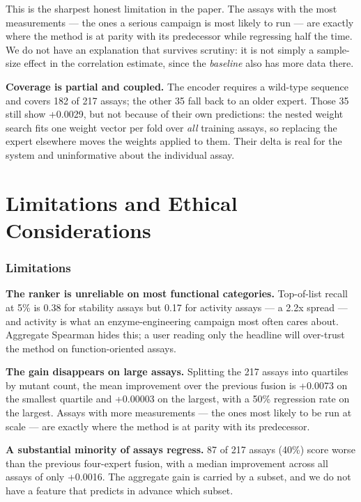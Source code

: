 \documentclass[sigconf,review,nonacm]{acmart}
\begin{document}
This is the sharpest honest limitation in the paper. The assays with the most measurements --- the ones a
serious campaign is most likely to run --- are exactly where the method is at parity with its predecessor
while regressing half the time. We do not have an explanation that survives scrutiny: it is not simply a
sample-size effect in the correlation estimate, since the \emph{baseline} also has more data there.

\textbf{Coverage is partial and coupled.} The encoder requires a wild-type sequence and covers 182 of 217
assays; the other 35 fall back to an older expert. Those 35 still show +0.0029, but not because of their
own predictions: the nested weight search fits one weight vector per fold over \emph{all} training assays, so
replacing the expert elsewhere moves the weights applied to them. Their delta is real for the system and
uninformative about the individual assay.

\section{Limitations and Ethical Considerations}\label{limitations-and-ethical-considerations}

\subsubsection*{Limitations}\label{limitations}

\textbf{The ranker is unreliable on most functional categories.} Top-of-list recall at 5\% is 0.38 for
stability assays but 0.17 for activity assays --- a 2.2x spread --- and activity is what an
enzyme-engineering campaign most often cares about. Aggregate Spearman hides this; a user reading only
the headline will over-trust the method on function-oriented assays.

\textbf{The gain disappears on large assays.} Splitting the 217 assays into quartiles by mutant count, the
mean improvement over the previous fusion is +0.0073 on the smallest quartile and +0.00003 on the
largest, with a 50\% regression rate on the largest. Assays with more measurements --- the ones most
likely to be run at scale --- are exactly where the method is at parity with its predecessor.

\textbf{A substantial minority of assays regress.} 87 of 217 assays (40\%) score worse than the previous
four-expert fusion, with a median improvement across all assays of only +0.0016. The aggregate gain is
carried by a subset, and we do not have a feature that predicts in advance which subset.
\end{document}

